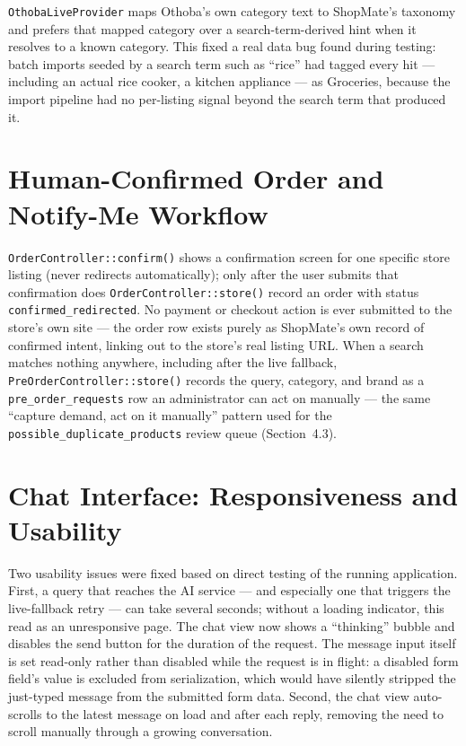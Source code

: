 \documentclass[12pt,a4paper]{report}
\begin{document}
\texttt{OthobaLiveProvider} maps Othoba's own category text to ShopMate's taxonomy and prefers that mapped
category over a search-term-derived hint when it resolves to a known category. This fixed a real data bug
found during testing: batch imports seeded by a search term such as ``rice'' had tagged every hit ---
including an actual rice cooker, a kitchen appliance --- as Groceries, because the import pipeline had no
per-listing signal beyond the search term that produced it.

\section{Human-Confirmed Order and Notify-Me Workflow}
\texttt{OrderController::confirm()} shows a confirmation screen for one specific store listing (never
redirects automatically); only after the user submits that confirmation does
\texttt{OrderController::store()} record an order with status \texttt{confirmed\_redirected}. No payment
or checkout action is ever submitted to the store's own site --- the order row exists purely as ShopMate's
own record of confirmed intent, linking out to the store's real listing URL. When a search matches nothing
anywhere, including after the live fallback, \texttt{PreOrderController::store()} records the query,
category, and brand as a \texttt{pre\_order\_requests} row an administrator can act on manually --- the
same ``capture demand, act on it manually'' pattern used for the \texttt{possible\_duplicate\_products}
review queue (Section~4.3).

\section{Chat Interface: Responsiveness and Usability}
Two usability issues were fixed based on direct testing of the running application. First, a query that
reaches the AI service --- and especially one that triggers the live-fallback retry --- can take several
seconds; without a loading indicator, this read as an unresponsive page. The chat view now shows a
``thinking'' bubble and disables the send button for the duration of the request. The message input itself
is set read-only rather than disabled while the request is in flight: a disabled form field's value is
excluded from serialization, which would have silently stripped the just-typed message from the submitted
form data. Second, the chat view auto-scrolls to the latest message on load and after each reply, removing
the need to scroll manually through a growing conversation.
\end{document}
